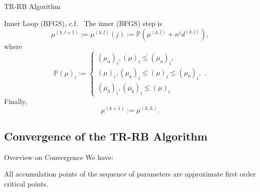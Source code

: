 \begin{frame}{TR-RB Algorithm}
    \begin{block}{Inner Loop (BFGS), c.f.~\cite{Qian2017, Keil2021}}
        The inner (BFGS) step is
        \begin{equation*}
            \mu^{(k, l + 1)} := \mu^{(k, l)}(j) := \mathbb{P}(\mu^{(k, l)} + \kappa^j d^{(k, l)}),
        \end{equation*}
        where
        \begin{equation*}
            {\mathbb{P}(\mu)}_i := \begin{cases}
                {(\mu_a)}_i, {(\mu)}_i \leq {(\mu_a)}_i, \\
                {(\mu)}_i, {(\mu_a)}_i \leq {(\mu)}_i \leq {(\mu_b)}_i, \\
                {(\mu_b)}_i, {(\mu_b)}_i \leq {(\mu)}_i
            \end{cases}.
        \end{equation*}
        Finally,
        \begin{equation*}
            \mu^{(k + 1)} := \mu^{(k, L)}.
        \end{equation*}
    \end{block}
\end{frame}

\subsection{Convergence of the TR-RB Algorithm}

\begin{frame}{Overview on Convergence}
    We have:
    \begin{block}{}
        All accumulation points of the sequence of parameters are approximate first order critical points.
    \end{block}
\end{frame}